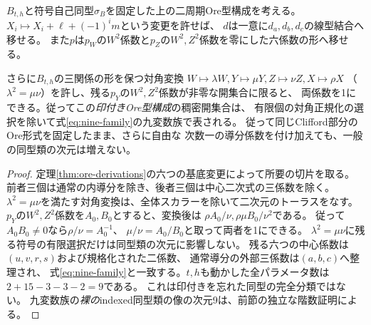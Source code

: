 \begin{corollary}[九変数正規形のOre型での十分性]\label{cor:ore-slice}
$B_{t,h}$と符号自己同型$\sigma_B$を固定した上の二周期Ore型構成を考える。
$X_i\mapsto X_i+\ell+(-1)^im$という変更を許せば、
$d$は一意に$d_a,d_b,d_c$の線型結合へ移せる。
また$p$は$p_W$の$W^2$係数と$p_Z$の$W^2,Z^2$係数を零にした六係数の形へ移せる。

さらに$B_{t,h}$の三関係の形を保つ対角変換
$W\mapsto\lambda W,Y\mapsto\mu Y,Z\mapsto\nu Z,X\mapsto\rho X$
（$\lambda^2=\mu\nu$）を許し、残る$p_Y$の$W^2,Z^2$係数が非零な開集合に限ると、
両係数を1にできる。従ってこの\emph{印付きOre型構成}の稠密開集合は、
有限個の対角正規化の選択を除いて式\eqref{eq:nine-family}の九変数族で表される。
従って同じClifford部分のOre形式を固定したまま、さらに自由な
次数一の導分係数を付け加えても、一般の同型類の次元は増えない。
\end{corollary}
\begin{proof}
定理\ref{thm:ore-derivations}の六つの基底変更によって所要の切片を取る。
前者三個は通常の内導分を除き、後者三個は中心二次式の三係数を除く。
$\lambda^2=\mu\nu$を満たす対角変換は、全体スカラーを除いて二次元のトーラスをなす。
$p_Y$の$W^2,Z^2$係数を$A_0,B_0$とすると、変換後は
$\rho A_0/\nu,\rho\mu B_0/\nu^2$である。
従って$A_0B_0\ne0$なら$\rho/\nu=A_0^{-1}$、
$\mu/\nu=A_0/B_0$と取って両者を1にできる。
$\lambda^2=\mu\nu$に残る符号の有限選択だけは同型類の次元に影響しない。
残る六つの中心係数は$(u,v,r,s)$および規格化された二係数、
通常導分の外部三係数は$(a,b,c)$へ整理され、
式\eqref{eq:nine-family}と一致する。$t,h$も動かした全パラメータ数は
$2+15-3-3-2=9$である。
これは印付きを忘れた同型の完全分類ではない。
九変数族の\emph{裸の}indexed同型類の像の次元9は、前節の独立な階数証明による。
\end{proof}

